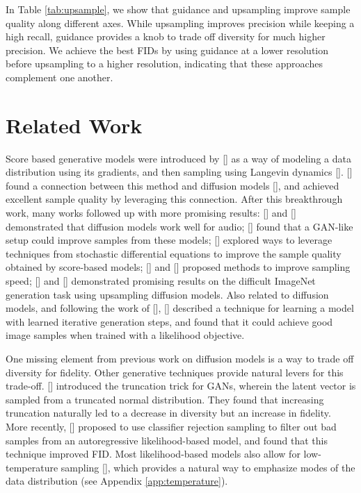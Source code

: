 In Table \ref{tab:upsample}, we show that guidance and upsampling improve sample quality along different axes. While upsampling improves precision while keeping a high recall, guidance provides a knob to trade off diversity for much higher precision. We achieve the best FIDs by using guidance at a lower resolution before upsampling to a higher resolution, indicating that these approaches complement one another.

\section{Related Work}
\label{sec:relwork}

Score based generative models were introduced by \citeauthor{scorematching} [] as a way of modeling a data distribution using its gradients, and then sampling using Langevin dynamics []. \citeauthor{ddpm} [] found a connection between this method and diffusion models [], and achieved excellent sample quality by leveraging this connection. After this breakthrough work, many works followed up with more promising results: \citeauthor{diffwave} [] and \citeauthor{wavegrad} [] demonstrated that diffusion models work well for audio; \citeauthor{adversarial} [] found that a GAN-like setup could improve samples from these models; \citeauthor{sde} [] explored ways to leverage techniques from stochastic differential equations to improve the sample quality obtained by score-based models; \citeauthor{ddim} [] and \citeauthor{improved} [] proposed methods to improve sampling speed; \citeauthor{improved} [] and \citeauthor{sr3} [] demonstrated promising results on the difficult ImageNet generation task using upsampling diffusion models. Also related to diffusion models, and following the work of \citeauthor{dickstein} [], \citeauthor{variationalwalkback} [] described a technique for learning a model with learned iterative generation steps, and found that it could achieve good image samples when trained with a likelihood objective.

One missing element from previous work on diffusion models is a way to trade off diversity for fidelity. Other generative techniques provide natural levers for this trade-off. \citeauthor{biggan} [] introduced the truncation trick for GANs, wherein the latent vector is sampled from a truncated normal distribution. They found that increasing truncation naturally led to a decrease in diversity but an increase in fidelity. More recently, \citeauthor{vqvae2} [] proposed to use classifier rejection sampling to filter out bad samples from an autoregressive likelihood-based model, and found that this technique improved FID. Most likelihood-based models also allow for low-temperature sampling [], which provides a natural way to emphasize modes of the data distribution (see Appendix \ref{app:temperature}).

